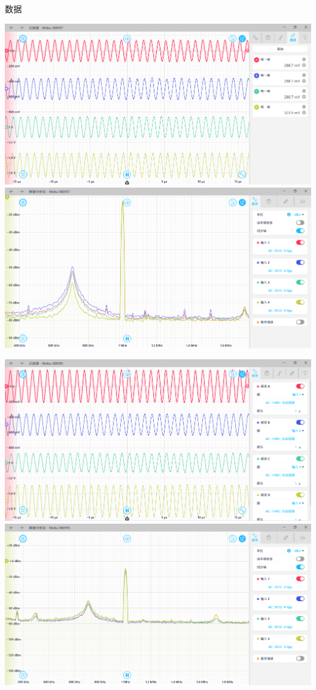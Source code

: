 \documentclass{beamer}
\begin{document}
\begin{frame}{数据}
    \begin{minipage}{0.5\textwidth}
        \includegraphics[width=\linewidth, height=0.45\textheight, keepaspectratio]{image/3.png}
        \includegraphics[width=\linewidth, height=0.45\textheight, keepaspectratio]{image/4.png}
    \end{minipage}%
    \begin{minipage}{0.5\textwidth}
        \includegraphics[width=\linewidth, height=0.45\textheight, keepaspectratio]{image/5.png}
        \includegraphics[width=\linewidth, height=0.45\textheight, keepaspectratio]{image/6.png}

\end{minipage}
\end{frame}
\end{document}
